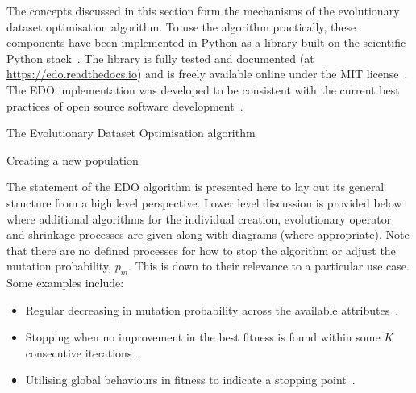 \documentclass[smallextended]{svjour3}
\newcommand{\balg}[1][htbp]{%
    \begin{algorithm}[#1]\DontPrintSemicolon
}
\newcommand{\ealg}{%
    \end{algorithm}
}
\begin{document}
The concepts discussed in this section form the mechanisms of the evolutionary
dataset optimisation algorithm. To use the algorithm practically, these
components have been implemented in Python as a library built on the scientific
Python stack~\cite{pandas,numpy}. The library is fully tested and documented (at
\url{https://edo.readthedocs.io}) and is freely available online under the MIT
license~\cite{edo-project}. The EDO implementation was developed to be
consistent with the current best practices of open source software
development~\cite{Jiminez2017}.

\balg%

\caption{The Evolutionary Dataset Optimisation algorithm}
\ealg\label{alg:edo}

\balg%

\caption{Creating a new population}
\ealg%

The statement of the EDO algorithm is presented here to lay out its general
structure from a high level perspective. Lower level discussion is provided
below where additional algorithms for the individual creation, evolutionary
operator and shrinkage processes are given along with diagrams (where
appropriate). Note that there are no defined processes for how to stop the
algorithm or adjust the mutation probability, \(p_m\). This is down to their
relevance to a particular use case. Some examples include:
\begin{itemize}
    \item Regular decreasing in mutation probability across the available
        attributes~\cite{Kuehn2013}.
    \item Stopping when no improvement in the best fitness is found within some
        \(K\) consecutive iterations~\cite{Leung2001}.
    \item Utilising global behaviours in fitness to indicate a stopping
        point~\cite{Marti2016}.
\end{itemize}
\end{document}
